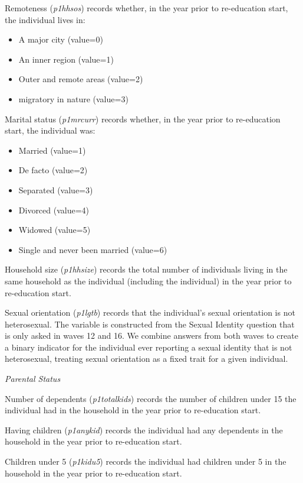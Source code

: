 \documentclass[12pt, a4paper]{article}
\begin{document}
Remoteness (\textit{p1\textunderscore{}hhsos}) records whether, in the year prior to re-education start, the individual lives in:
\begin{itemize}
  \item A major city (value=0)
  \item An inner region (value=1)
  \item Outer and remote areas (value=2) 
  \item migratory in nature (value=3)
\end{itemize}  

Marital status (\textit{p1\textunderscore{}mrcurr}) records whether, in the year prior to re-education start, the individual was:
\begin{itemize}
  \item Married (value=1)
  \item De facto (value=2)
  \item Separated (value=3)
  \item Divorced (value=4)
  \item Widowed (value=5)
  \item Single and never been married (value=6)
\end{itemize}  

Household size (\textit{p1\textunderscore{}hhsize}) records the total number of individuals living in the same household as the individual (including the individual) in the year prior to re-education start.

Sexual orientation (\textit{p1\textunderscore{}lgtb}) records that the individual’s sexual orientation is not heterosexual.  The variable is constructed from the Sexual Identity question that is only asked in waves 12 and 16. We combine answers from both waves to create a binary indicator for the individual ever reporting a sexual identity that is not heterosexual, treating sexual orientation as a fixed trait for a given individual. 
  
\emph{Parental Status}

Number of dependents (\textit{p1\textunderscore{}totalkids}) records the number of children under 15 the individual had in the household in the year prior to re-education start. 

Having children (\textit{p1\textunderscore{}anykid}) records the individual had any dependents in the household in the year prior to re-education start. 

Children under 5 (\textit{p1\textunderscore{}kidu5}) records the individual had children under 5 in the household in the year prior to re-education start. 
\end{document}
